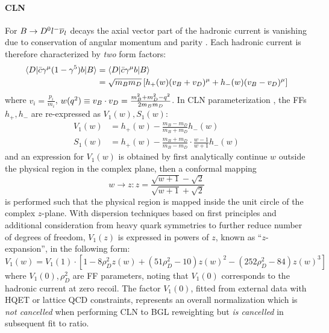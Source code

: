 \paragraph{CLN}
For $B \rightarrow {\ensuremath{{D}^0}}{\ensuremath{l^-}}{\ensuremath{{\overline{\nu}}_l}}$ decays the axial vector part of the hadronic
current is vanishing due to conservation of angular momentum and parity
\cite{Bernlochner_2022}.
Each hadronic current is therefore characterized by \emph{two} form factors:
\begin{align}
    \langle D\rvert \bar{c} \gamma^\mu(1 - \gamma^5) b \lvert B\rangle &=
    \langle D\rvert \bar{c} \gamma^\mu b \lvert B\rangle
    \nonumber \\
    &=
    \sqrt{m_B m_D} \left[
        h_+(w)(v_B + v_D)^\mu + h_-(w)(v_B - v_D)^\mu
    \right]
    \label{eqn:b-d-cln-param}
\end{align}
where $v_i = \frac{p_i}{m_i}$,
$w(q^2) \equiv v_B \cdot v_D = \frac{m^2_B + m^2_D - q^2}{2 m_B m_D}$.
In CLN parameterization \cite{Caprini_1998},
the FFs $h_+, h_-$ are re-expressed as $V_1(w), S_1(w)$:
\begin{align}
    V_1(w) &= h_+(w) - \frac{m_B - m_D}{m_B + m_D} h_-(w) \\
    S_1(w) &= h_+(w) - \frac{m_B + m_D}{m_B - m_D} \cdot \frac{w-1}{w+1} h_-(w)
\end{align}
and an expression for $V_1(w)$ is obtained by first analytically continue $w$
outside the physical region in the complex plane, then a conformal mapping
\begin{equation}
    w \rightarrow z: z =
    \frac{\sqrt{w+1} - \sqrt{2}}{\sqrt{w+1} + \sqrt{2}}
\end{equation}
is performed such that the physical region is mapped inside the unit circle of
the complex $z$-plane.
With dispersion techniques based on first principles and additional
consideration from heavy quark symmetries to further reduce number of degrees of
freedom,
$V_1(z)$ is expressed in powers of $z$, known as ``$z$-expansion'', in the
following form:
\begin{equation}
    V_1(w) = V_1(1) \cdot \left[
        1 - 8 \rho^2_D z(w) + (51 \rho^2_D - 10) z(w)^2 -
        (252 \rho^2_D - 84) z(w)^3
    \right]
\end{equation}
where $V_1(0), \rho^2_D$ are FF parameters,
noting that $V_1(0)$ corresponds to the hadronic current at zero recoil.
The factor $V_1(0)$,
fitted from external data with HQET or lattice QCD constraints,
represents an overall normalization which is \emph{not cancelled} when
performing CLN to BGL reweighting but \emph{is cancelled} in subsequent fit to
\RD ratio.


